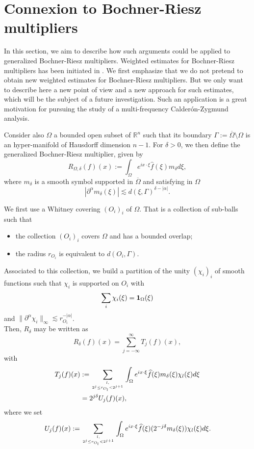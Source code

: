 \documentclass[11pt]{amsart}
\theoremstyle{remark}
\newcommand{\mb}{\medskip\noindent}
\newcommand{\rn}{\mathbb{R}^n}
\begin{document}
\section{Connexion to Bochner-Riesz multipliers} \label{sec3}

In this section, we aim to describe how such arguments could be applied to generalized Bochner-Riesz multipliers. Weighted estimates for Bochner-Riesz multipliers has been initiated in \cite{Vargas, Christ, CDL}. We first emphasize that we do not pretend to obtain new weighted estimates for Bochner-Riesz multipliers. But we only want to describe here a new point of view and a new approach for such estimates, which will be the subject of a future investigation. Such an application is a great motivation for pursuing the study of a multi-frequency Calder\'on-Zygmund analysis.

\mb

Consider also $\Omega$ a bounded open subset of $\rn$ such that its boundary $\Gamma:=\overline{\Omega}\setminus \Omega$ is an hyper-manifold of Hausdorff dimension $n-1$. For $\delta>0$, we then define the generalized Bochner-Riesz multiplier, given by
$$ R_{\Omega,\delta}(f) (x) := \int_\Omega e^{ix\cdot \xi} \widehat{f}(\xi) m_\delta d\xi,$$
where $m_\delta$ is a smooth symbol supported in $\overline{\Omega}$ and satisfying in $\Omega$
$$ | \partial^\alpha m_\delta(\xi)| \lesssim d(\xi,\Gamma)^{\delta-|\alpha|}.$$

\mb 
We first use a Whitney covering $(O_i)_i$ of $\Omega$. That is a collection of sub-balls such that
\begin{itemize}
 \item the collection $(O_i)_i$ covers $\Omega$ and has a bounded overlap;
 \item the radius $r_{O_i}$ is equivalent to $d(O_i,\Gamma)$.
\end{itemize}
Associated to this collection, we build a partition of the unity $(\chi_i)_i$ of smooth functions such that $\chi_i$ is supported on $O_i$ with 
$$ \sum_i \chi_i(\xi) = {\bf 1}_{\Omega}(\xi)$$
and $\|\partial^\alpha \chi_i\|_\infty \lesssim r_{O_i}^{-|\alpha|}$. \\
Then, $R_{\delta}$ may be written as
$$ R_{\delta}(f) (x) = \sum_{j=-\infty}^\infty T_j(f)(x),$$
with
\begin{align}
 T_j(f)(x) & :=\sum_{\genfrac{}{}{0pt}{}{l,}{2^j \leq r_{O_l}< 2^{j+1}}} \int_\Omega e^{ix\cdot \xi} \widehat{f}(\xi) m_\delta(\xi) \chi_l(\xi) d\xi \nonumber \\
 & =2^{j\delta} U_j(f)(x), \label{eq:dec}
 \end{align}
where we set
$$ U_j(f)(x):= \sum_{\genfrac{}{}{0pt}{}{l,}{2^j \leq r_{O_l}< 2^{j+1}}} \int_\Omega e^{ix\cdot \xi} \widehat{f}(\xi) (2^{-j\delta} m_\delta(\xi)) \chi_l(\xi) d\xi.$$
\end{document}
